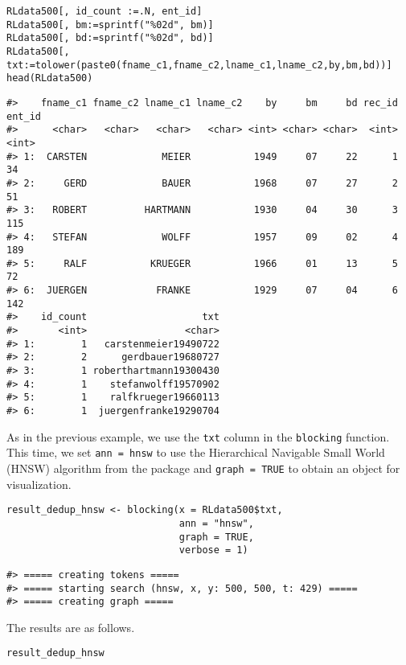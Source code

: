 \begin{verbatim}
RLdata500[, id_count :=.N, ent_id]
RLdata500[, bm:=sprintf("%02d", bm)]
RLdata500[, bd:=sprintf("%02d", bd)]
RLdata500[, txt:=tolower(paste0(fname_c1,fname_c2,lname_c1,lname_c2,by,bm,bd))]
head(RLdata500)
\end{verbatim}

\begin{verbatim}
#>    fname_c1 fname_c2 lname_c1 lname_c2    by     bm     bd rec_id ent_id
#>      <char>   <char>   <char>   <char> <int> <char> <char>  <int>  <int>
#> 1:  CARSTEN             MEIER           1949     07     22      1     34
#> 2:     GERD             BAUER           1968     07     27      2     51
#> 3:   ROBERT          HARTMANN           1930     04     30      3    115
#> 4:   STEFAN             WOLFF           1957     09     02      4    189
#> 5:     RALF           KRUEGER           1966     01     13      5     72
#> 6:  JUERGEN            FRANKE           1929     07     04      6    142
#>    id_count                    txt
#>       <int>                 <char>
#> 1:        1   carstenmeier19490722
#> 2:        2      gerdbauer19680727
#> 3:        1 roberthartmann19300430
#> 4:        1    stefanwolff19570902
#> 5:        1    ralfkrueger19660113
#> 6:        1  juergenfranke19290704
\end{verbatim}

As in the previous example, we use the \texttt{txt} column in the \texttt{blocking}
function. This time, we set \texttt{ann\ =\ hnsw} to use the Hierarchical
Navigable Small World (HNSW) algorithm from the 
package and \texttt{graph\ =\ TRUE} to obtain an  object for
visualization.

\begin{verbatim}
result_dedup_hnsw <- blocking(x = RLdata500$txt,
                              ann = "hnsw",
                              graph = TRUE,
                              verbose = 1)
\end{verbatim}

\begin{verbatim}
#> ===== creating tokens =====
#> ===== starting search (hnsw, x, y: 500, 500, t: 429) =====
#> ===== creating graph =====
\end{verbatim}

The results are as follows.

\begin{verbatim}
result_dedup_hnsw
\end{verbatim}


